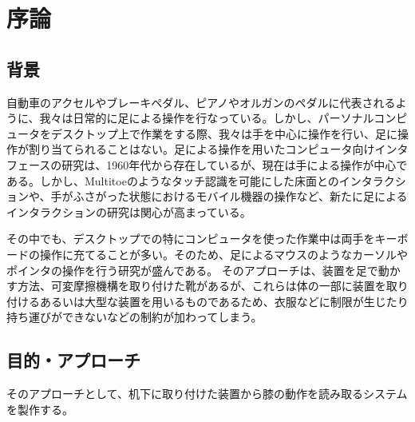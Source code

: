 \chapter{序論}

\section{背景}
自動車のアクセルやブレーキペダル、ピアノやオルガンのペダルに代表されるように、我々は日常的に足による操作を行なっている。しかし、パーソナルコンピュータをデスクトップ上で作業をする際、我々は手を中心に操作を行い、足に操作が割り当てられることはない。足による操作を用いたコンピュータ向けインタフェースの研究は、1960年代から存在している\cite{1698228}が、現在は手による操作が中心である。しかし、Multitoe\cite{Augsten:2010:MHI:1866029.1866064}のようなタッチ認識を可能にした床面とのインタラクションや、手がふさがった状態におけるモバイル機器の操作\cite{Fan:2017:ESF:3123021.3123043, okumura_2011}など、新たに足によるインタラクションの研究は関心が高まっている。\par
その中でも、デスクトップでの特にコンピュータを使った作業中は両手をキーボードの操作に充てることが多い。そのため、足によるマウスのようなカーソルやポインタの操作を行う研究が盛んである。
そのアプローチは、装置を足で動かす方法\cite{Pearson:1986:MMD:22627.22392, Pearson:1988:EET:49108.1046356}、可変摩擦機構を取り付けた靴\cite{Horodniczy:2017:FHE:3025453.3025625}があるが、これらは体の一部に装置を取り付けるあるいは大型な装置を用いるものであるため、衣服などに制限が生じたり持ち運びができないなどの制約が加わってしまう。



\section{目的・アプローチ}
そのアプローチとして、机下に取り付けた装置から膝の動作を読み取るシステムを製作する。

